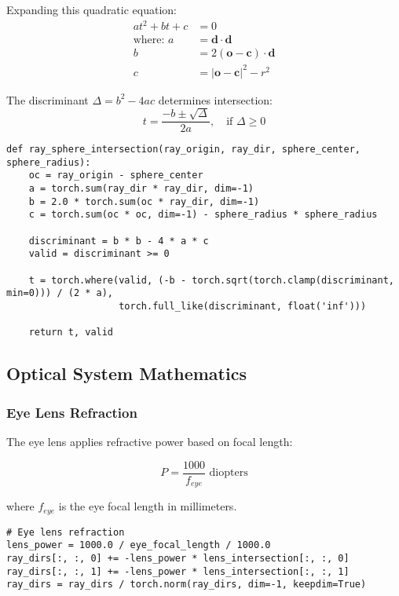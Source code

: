 \documentclass[12pt,a4paper]{article}
\begin{document}
Expanding this quadratic equation:
\begin{align}
at^2 + bt + c &= 0 \\
\text{where: } a &= \mathbf{d} \cdot \mathbf{d} \\
b &= 2(\mathbf{o} - \mathbf{c}) \cdot \mathbf{d} \\
c &= |\mathbf{o} - \mathbf{c}|^2 - r^2
\end{align}

The discriminant $\Delta = b^2 - 4ac$ determines intersection:
\begin{equation}
t = \frac{-b \pm \sqrt{\Delta}}{2a}, \quad \text{if } \Delta \geq 0
\end{equation}

\begin{lstlisting}[caption=Ray-Sphere Intersection Implementation]
def ray_sphere_intersection(ray_origin, ray_dir, sphere_center, sphere_radius):
    oc = ray_origin - sphere_center
    a = torch.sum(ray_dir * ray_dir, dim=-1)
    b = 2.0 * torch.sum(oc * ray_dir, dim=-1)
    c = torch.sum(oc * oc, dim=-1) - sphere_radius * sphere_radius
    
    discriminant = b * b - 4 * a * c
    valid = discriminant >= 0
    
    t = torch.where(valid, (-b - torch.sqrt(torch.clamp(discriminant, min=0))) / (2 * a), 
                    torch.full_like(discriminant, float('inf')))
    
    return t, valid
\end{lstlisting}

\subsection{Optical System Mathematics}

\subsubsection{Eye Lens Refraction}
The eye lens applies refractive power based on focal length:

\begin{equation}
P = \frac{1000}{f_{eye}} \text{ diopters}
\end{equation}

where $f_{eye}$ is the eye focal length in millimeters.

\begin{lstlisting}[caption=Eye Lens Refraction]
# Eye lens refraction
lens_power = 1000.0 / eye_focal_length / 1000.0
ray_dirs[:, :, 0] += -lens_power * lens_intersection[:, :, 0]  
ray_dirs[:, :, 1] += -lens_power * lens_intersection[:, :, 1]
ray_dirs = ray_dirs / torch.norm(ray_dirs, dim=-1, keepdim=True)
\end{lstlisting}
\end{document}
